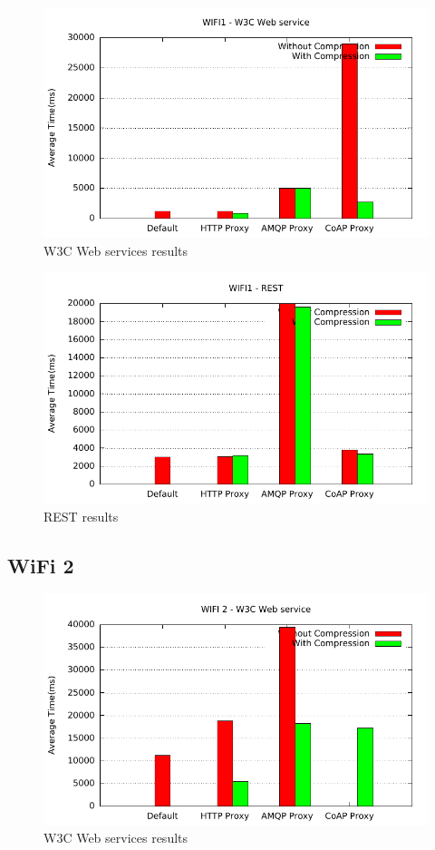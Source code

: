 \begin{figure}[H]
\center
\includegraphics[scale=0.75]{../results/wifi1/nffi/out.pdf}
\caption{W3C Web services results}
\end{figure}

\begin{figure}[H]
\center
\includegraphics[scale=0.75]{../results/wifi1/rest/out.pdf}
\caption{REST results}
\end{figure}


\subsection{WiFi 2}

\begin{figure}[H]
\center
\includegraphics[scale=0.75]{../results/wifi2/nffi/out.pdf}
\caption{W3C Web services results}
\end{figure}

